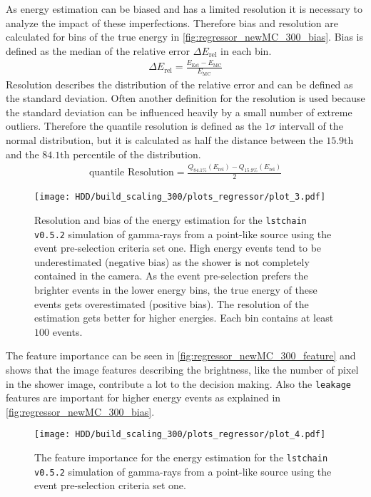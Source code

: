As energy estimation can be biased and has a limited resolution it is necessary to analyze the impact of these imperfections. 
Therefore bias and resolution are calculated for bins of the true energy in \autoref{fig:regressor_newMC_300_bias}.
Bias is defined as the median of the relative error $\Delta E_\text{rel}$ in each bin.
\begin{align}
    \Delta E_\text{rel} = \frac{E_\text{Est} - E_\text{MC}}{E_\text{MC}}
\end{align}
Resolution describes the distribution of the relative error and can be defined as the standard deviation.
Often another definition for the resolution is used because the standard deviation can be influenced heavily by a small number of extreme outliers.
Therefore the quantile resolution is defined as the $1\sigma$ intervall of the normal distribution, but it is calculated as half the distance 
between the $\num{15.9}$th and the $\num{84.1}$th percentile of the distribution.
\begin{align}
    \text{quantile Resolution} = \frac{Q_\text{84.1\%}(E_\text{rel}) - Q_\text{15.9\%}(E_\text{rel})}{2}
\end{align}
\begin{figure}
    \centering
    \texttt{[image: HDD/build\_scaling\_300/plots\_regressor/plot\_3.pdf]}
    \caption{Resolution and bias of the energy estimation for the \texttt{lstchain v0.5.2} simulation of gamma-rays from a point-like source 
        using the event pre-selection criteria set one.
        High energy events tend to be underestimated (negative bias) as the shower is not completely contained in the camera.
        As the event pre-selection prefers the brighter events in the lower energy bins, the true energy of these events gets overestimated (positive bias).
        The resolution of the estimation gets better for higher energies.
        Each bin contains at least $\num{100}$ events.
    }
    \label{fig:regressor_newMC_300_bias}
\end{figure}

The feature importance can be seen in \autoref{fig:regressor_newMC_300_feature} and shows that the image features describing the brightness, 
like the number of pixel in the shower image, contribute a lot to the decision making.
Also the \texttt{leakage} features are important for higher energy events as explained in \autoref{fig:regressor_newMC_300_bias}.
\begin{figure}
    \centering
    \texttt{[image: HDD/build\_scaling\_300/plots\_regressor/plot\_4.pdf]}
    \caption{The feature importance for the energy estimation for the \texttt{lstchain v0.5.2} simulation of gamma-rays from a point-like source using 
        the event pre-selection criteria set one.
    }
    \label{fig:regressor_newMC_300_feature}
\end{figure}

